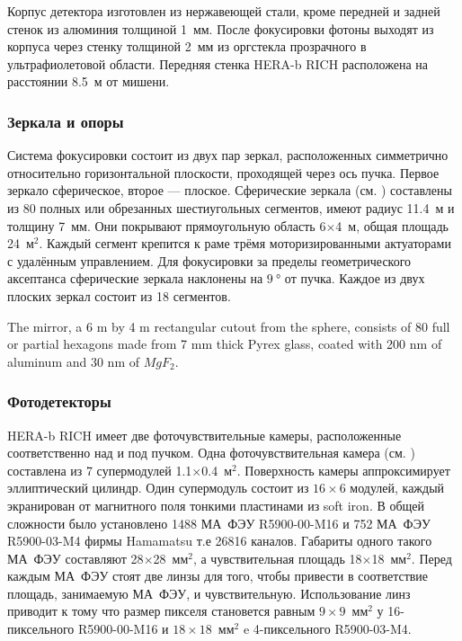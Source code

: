 Корпус детектора изготовлен из нержавеющей стали, кроме передней и задней стенок из алюминия толщиной 1~мм. После фокусировки фотоны выходят из корпуса через стенку толщиной 2~мм из оргстекла прозрачного в ультрафиолетовой области. Передняя стенка HERA-b RICH расположена на расстоянии 8.5~м от мишени.

\subsubsection{Зеркала и опоры}

Система фокусировки состоит из двух пар зеркал, расположенных симметрично относительно горизонтальной плоскости, проходящей через ось пучка. Первое зеркало сферическое, второе --- плоское. Сферические зеркала (см. ) составлены из 80 полных или обрезанных шестиугольных сегментов, имеют радиус 11.4~м и толщину 7~мм. Они покрывают прямоугольную область 6$\times$4~м, общая площадь 24~м$^2$. Каждый сегмент крепится к раме трёмя моторизированными актуаторами с удалённым управлением. Для фокусировки за пределы геометрического аксептанса сферические зеркала наклонены на $\SI{9}{\degree}$ от пучка. Каждое из двух плоских зеркал состоит из 18 сегментов.


The mirror, a 6 m by 4 m rectangular cutout from the sphere, consists of 80 full or partial hexagons made from 7 mm thick Pyrex glass, coated with 200 nm of aluminum and 30 nm of $MgF_{2}$.

\subsubsection{Фотодетекторы}

HERA-b RICH имеет две фоточувствительные камеры, расположенные соответственно над и под пучком. Одна фоточувствительная камера (см. ) составлена из 7 супермодулей 1.1$\times$0.4~м$^2$. Поверхность камеры аппроксимирует эллиптический цилиндр. Один супермодуль состоит из $16 \times 6$ модулей, каждый экранирован от магнитного поля тонкими пластинами из soft iron. В общей сложности было установлено 1488 МА~ФЭУ R5900-00-M16 и 752 МА~ФЭУ R5900-03-M4 фирмы Hamamatsu т.е 26816 каналов. Габариты одного такого МА~ФЭУ составляют 28$\times$28~мм$^2$, а чувствительная площадь 18$\times$18~мм$^2$. Перед каждым МА~ФЭУ стоят две линзы для того, чтобы привести в соответствие площадь, занимаемую МА~ФЭУ, и чувствительную. Использование линз приводит к тому что размер пикселя становется равным $9 \times 9$~мм$^2$ у 16-пиксельного R5900-00-M16 и $18 \times 18$~мм$^2$ e 4-пиксельного R5900-03-M4.

